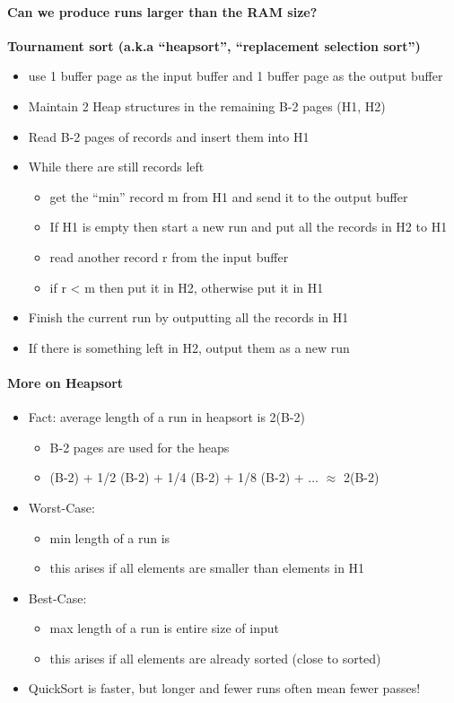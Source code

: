\newpage
\paragraph{Can we produce runs larger than the RAM size?}

\textbf{Tournament sort (a.k.a ``heapsort'',
  ``replacement selection sort'')}
\begin{itemize}
\item use 1 buffer page as the input buffer and 1 buffer page as
  the output buffer
\item Maintain 2 Heap structures in the remaining B-2 pages
  (H1, H2)
\item Read B-2 pages of records and insert them into H1
\item While there are still records left
  \begin{itemize}
  \item get the ``min'' record m from H1 and send it to the output
    buffer
  \item If H1 is empty then start a new run and put all the records
    in H2 to H1
  \item read another record r from the input buffer
  \item if r < m then put it in H2, otherwise put it in H1
  \end{itemize}
\item Finish the current run by outputting all the records in H1
\item If there is something left in H2, output them as a new run
\end{itemize}

\paragraph{More on Heapsort}
\begin{itemize}
\item Fact: average length of a run in heapsort is 2(B-2)
  \begin{itemize}
  \item B-2 pages are used for the heaps
  \item (B-2) + 1/2 (B-2) + 1/4 (B-2) + 1/8 (B-2) + $\ldots$
    $\approx$ 2(B-2)
  \end{itemize}
\item Worst-Case:
  \begin{itemize}
  \item min length of a run is
  \item this arises if all elements are smaller than elements in H1
  \end{itemize}
\item Best-Case:
  \begin{itemize}
  \item max length of a run is entire size of input
  \item this arises if all elements are already sorted (close to sorted)
  \end{itemize}
\item QuickSort is faster, but longer and fewer runs often mean
  fewer passes!
\end{itemize}

